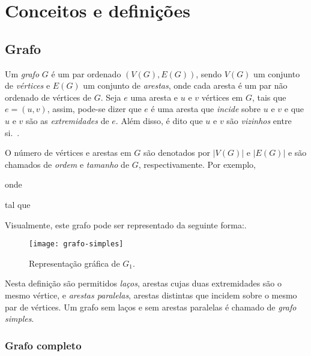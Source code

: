 \chapter{Conceitos e defini{\c   c}{\~o}es}
\label{conceitos}

\section{Grafo}
\label{conceitos__grafo}

Um \emph{grafo} $G$ é um par ordenado $(V(G), E(G))$, sendo $V(G)$ um conjunto de \emph{vértices} e $E(G)$ um conjunto de \emph{arestas}, onde cada aresta é um par não ordenado de vértices de $G$. Seja $e$ uma aresta e $u$ e $v$ vértices em $G$, tais que $e = (u, v)$, assim, pode-se dizer que $e$ é uma aresta que \emph{incide} sobre $u$ e $v$ e que $u$ e $v$ são as \emph{extremidades} de $e$. Além disso, é dito que $u$ e $v$ são \emph{vizinhos} entre si.~\cite{bondy1976graph}.

O número de vértices e arestas em $G$ são denotados por $|V(G)|$ e $|E(G)|
$ e são chamados de \emph{ordem} e \emph{tamanho} de $G$, respectivamente. Por exemplo,


\noindent onde



\noindent tal que



Visualmente, este grafo pode ser representado da seguinte forma:.

\begin{figure}[h]
\texttt{[image: grafo-simples]}
\centering
\caption{Representação gráfica de $G_1$.}
\label{fig:grafo-simples}
\end{figure}

Nesta definição são permitidos \emph{laços}, arestas cujas duas extremidades são o mesmo vértice, e \emph{arestas paralelas}, arestas distintas que incidem sobre o mesmo par de vértices. Um grafo sem laços e sem arestas paralelas é chamado de \emph{grafo simples}.

\subsection{Grafo completo}
\label{conceitos__grafo--comleto}

